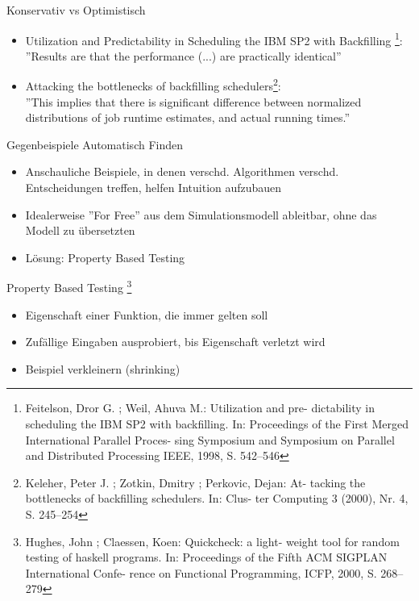 \documentclass[aspectratio=169,10pt]{beamer}
\begin{document}
\begin{frame}[t, fragile]{Konservativ vs Optimistisch}
	\begin{itemize}
		\item Utilization and Predictability in Scheduling the IBM SP2 with Backfilling
		\footnote{Feitelson, Dror G. ; Weil, Ahuva M.: Utilization and pre-
			dictability in scheduling the IBM SP2 with backfilling. In:
			Proceedings of the First Merged International Parallel Proces-
			sing Symposium and Symposium on Parallel and Distributed
			Processing IEEE, 1998, S. 542–546}:\\
		''Results are that the performance (...) are practically identical''
		\item Attacking the bottlenecks of backfilling schedulers\footnote{Keleher, Peter J. ; Zotkin, Dmitry ; Perkovic, Dejan: At-
			tacking the bottlenecks of backfilling schedulers. In: Clus-
			ter Computing 3 (2000), Nr. 4, S. 245–254}:\\
		''This implies that there is significant difference between normalized distributions of job runtime estimates, and actual
		running times.''
	\end{itemize}
\end{frame}

\begin{frame}[t,fragile]{Gegenbeispiele Automatisch Finden}
	\begin{itemize}
		\item \alert{Anschauliche} Beispiele, in denen verschd. Algorithmen verschd. Entscheidungen treffen, helfen Intuition aufzubauen
		\item Idealerweise ''For Free'' aus dem Simulationsmodell ableitbar, ohne das Modell zu \"ubersetzten 
		\item L\"osung: \alert{Property Based Testing}
	\end{itemize}
\end{frame}
\begin{frame}[t,fragile]{Property Based Testing \footnote{Hughes, John ; Claessen, Koen: Quickcheck: a light-
		weight tool for random testing of haskell programs. In:
		Proceedings of the Fifth ACM SIGPLAN International Confe-
		rence on Functional Programming, ICFP, 2000, S. 268–279}}
	\begin{itemize}
		\item Eigenschaft einer Funktion, die immer gelten soll
		\item Zuf\"allige Eingaben ausprobiert, bis Eigenschaft verletzt wird
		\item Beispiel verkleinern (shrinking) 
	\end{itemize}
\end{frame}
\end{document}
